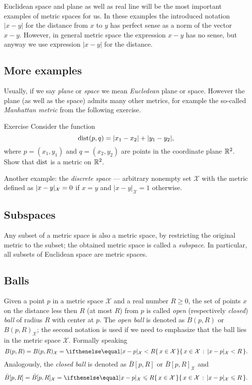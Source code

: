 Euclidean space and plane as well as real line will be the most important examples of metric spaces for us.
In these examples the introduced notation $|x-y|$ for the distance from $x$ to $y$ has perfect sense as a norm of the vector $x-y$.
However, in general metric space the expression $x-y$ has no sense, but anyway we use expression $|x-y|$ for the distance.

\subsection*{More examples}

Usually, if we say {}\emph{plane} or {}\emph{space} we mean {}\emph{Eucledean} plane or space.
However the plane (as well as the space) admits many other metrics, for example the so-called \emph{Manhattan metric} from the following exercise.

\begin{thm}{Exercise}\label{ex:ell-infty}
Consider the function
$$\mathop{\rm dist}\nolimits(p,q)=|x_1-x_2|+|y_1-y_2|,$$
where $p=(x_1,y_1)$ and $q=(x_2,y_2)$ are points in the coordinate plane $\mathbb{R}^2$.
Show that $\mathop{\rm dist}\nolimits$ is a metric on $\mathbb{R}^2$.
\end{thm}

Another example: the \emph{discrete space} --- arbitrary nonempty set $\mathcal X$ with the metric defined as $|x\z-y|_{\mathcal X}=0$ if $x=y$ and $|x-y|_{\mathcal X}=1$ otherwise.

\subsection*{Subspaces}
Any subset of a metric space is also a metric space, by restricting the original metric to the subset;
the obtained metric space is called a \emph{subspace}.
In particular, all subsets of Euclidean space are metric spaces.

\subsection*{Balls}
Given a point $p$ in a metric space ${\mathcal X}$ and a real number $R\ge 0$, the set of points $x$ on the distance less then $R$ (at most $R$) from $p$ is called \emph{open} (respectively \emph{closed}) \emph{ball} of radius $R$ with center at $p$.
The {}\emph{open ball} is denoted as $B(p,R)$ or $B(p,R)_{\mathcal X}$;
the second notation is used if we need to emphasize that the ball lies in the metric space $\mathcal X$.
Formally speaking
\[B(p,R)=B(p,R)_{\mathcal X}=\set{x\in \mathcal X}{|x-p|_{\mathcal X}< R}.\]
Analogously, the {}\emph{closed ball} is denoted as $\bar B[p,R]$ or $\bar B[p,R]_{\mathcal X}$ and
\[\bar B[p,R]=\bar B[p,R]_{\mathcal X}=\set{x\in \mathcal X}{|x-p|_{\mathcal X}\le R}.\]

